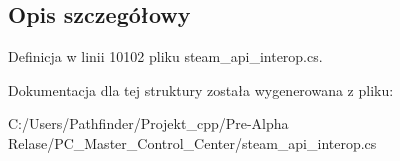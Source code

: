 \subsection{Opis szczegółowy}


Definicja w linii 10102 pliku steam\+\_\+api\+\_\+interop.\+cs.



Dokumentacja dla tej struktury została wygenerowana z pliku\+:\begin{DoxyCompactItemize}
\item 
C\+:/\+Users/\+Pathfinder/\+Projekt\+\_\+cpp/\+Pre-\/\+Alpha Relase/\+P\+C\+\_\+\+Master\+\_\+\+Control\+\_\+\+Center/steam\+\_\+api\+\_\+interop.\+cs\end{DoxyCompactItemize}
